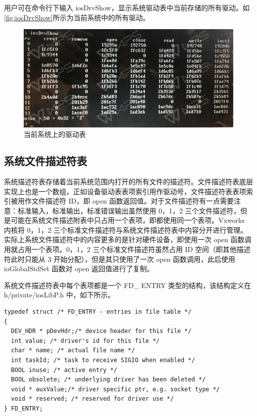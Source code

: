 	用户可在命令行下输入 iosDrvShow，显示系统驱动表中当前存储的所有驱动。如\autoref{fig:iosDrvShow}所示为当前系统中的所有驱动。
\begin{figure}[!h]
\centering
\includegraphics[width=.9\textwidth]{./graphics/iosDrvShow.pdf}
\caption{当前系统上的驱动表}\label{fig:iosDrvShow}
\end{figure}

\subsection{系统文件描述符表}
	系统描述符表存储着当前系统范围内打开的所有文件的描述符。文件描述符表底层实现上也是一个数组，正如设备驱动表表项索引用作驱动号，文件描述符表表项索引被用作文件描述符 ID，即 open 函数返回值。对于文件描述符有一点需要注意：标准输入，标准输出，标准错误输出虽然使用 0，1，2 三个文件描述符，但是可能在系统文件描述附表中只占用一个表项，即都使用同一个表项。Vxworks 内核将 0，1，2 三个标准文件描述符与系统文件描述符表中内容分开进行管理。实际上系统文件描述符中的内容更多的是针对硬件设备，即使用一次 open 函数调用就占用一个表项。0，1，2 三个标准文件描述符虽然占用 ID 空间（即其他描述符此时只能从 3 开始分配），但是其只使用了一次 open 函数调用，此后使用 ioGlobalStdSet 函数对 open 返回值进行了复制。
	
	系统文件描述符表中每个表项都是一个 FD\_ ENTRY 类型的结构，该结构定义在h/private/iosLibP.h 中，如下所示。
\lstset{language=C}
\begin{lstlisting}
typedef struct /* FD_ENTRY - entries in file table */ 
{ 
  DEV_HDR * pDevHdr;/* device header for this file */ 
  int value; /* driver's id for this file */ 
  char * name; /* actual file name */ 
  int taskId; /* task to receive SIGIO when enabled */ 
  BOOL inuse; /* active entry */ 
  BOOL obsolete; /* underlying driver has been deleted */ 
  void * auxValue;/* driver specific ptr, e.g. socket type */ 
  void * reserved; /* reserved for driver use */ 
} FD_ENTRY; 
\end{lstlisting}

